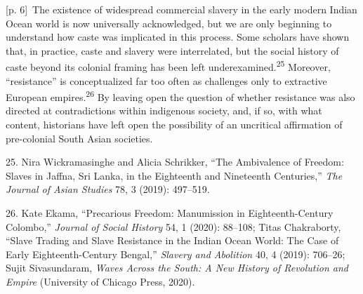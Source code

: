 \documentclass[10pt,a4paper]{article}
\begin{document}
{\scriptsize\color{gray} [p. 6]}\ The existence of widespread commercial slavery in the early modern Indian Ocean world is now universally acknowledged, but we are only beginning to understand how caste was implicated in this process. Some scholars have shown that, in practice, caste and slavery were interrelated, but the social history of caste beyond its colonial framing has been left underexamined.\nobreak\textsuperscript{25} Moreover, “resistance” is conceptualized far too often as challenges only to extractive European empires.\nobreak\textsuperscript{26} By leaving open the question of whether resistance was also directed at contradictions within indigenous society, and, if so, with what content, historians have left open the possibility of an uncritical affirmation of pre-colonial South Asian societies.\par{\small 25. Nira Wickramasinghe and Alicia Schrikker, “The Ambivalence of Freedom: Slaves in Jaffna, Sri Lanka, in the Eighteenth and Nineteenth Centuries,” \textit{The Journal of Asian Studies} 78, 3 (2019): 497–519.\par}{\small 26. Kate Ekama, “Precarious Freedom: Manumission in Eighteenth-Century Colombo,” \textit{Journal of Social History} 54, 1 (2020): 88–108; Titas Chakraborty, “Slave Trading and Slave Resistance in the Indian Ocean World: The Case of Early Eighteenth-Century Bengal,” \textit{Slavery and Abolition} 40, 4 (2019): 706–26; Sujit Sivasundaram, \textit{Waves Across the South: A New History of Revolution and Empire} (University of Chicago Press, 2020).\par}
\end{document}
